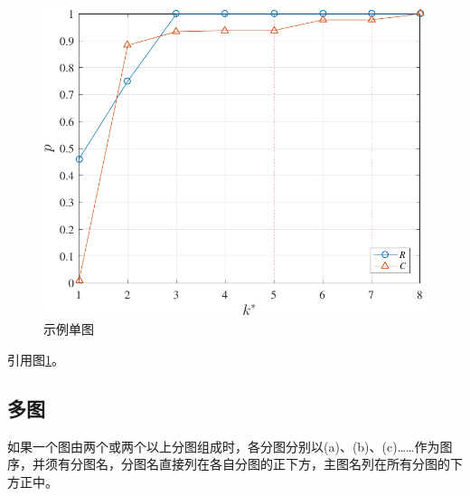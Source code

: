 \documentclass[GBK,UTF8,12pt,oneside,a4paper]{ctexbook}
\begin{document}
\begin{figure}[!htb]
\centering
\begin{minipage}[t]{\oneimage}
\centering
\includegraphics[width=\oneimage]{Correct_Ratio.pdf}
\end{minipage}
\setlength{\abovecaptionskip}{6pt} %
\setlength{\belowcaptionskip}{12pt} %
\caption{示例单图}
\label{fig:ratio}
\end{figure}
引用图\ref{fig:ratio}。
\subsection{多图}
如果一个图由两个或两个以上分图组成时，各分图分别以(a)、(b)、(c)……作为图序，并须有分图名，分图名直接列在各自分图的正下方，主图名列在所有分图的下方正中。
\end{document}
